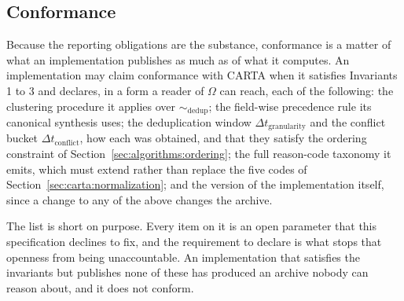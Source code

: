 \subsection{Conformance}
\label{sec:carta:conformance}

Because the reporting obligations are the substance, conformance is a matter of
what an implementation publishes as much as of what it computes. An
implementation may claim conformance with CARTA when it satisfies Invariants 1 to
3 and declares, in a form a reader of $\Omega$ can reach, each of the following:
the clustering procedure it applies over $\sim_{\text{dedup}}$; the field-wise
precedence rule its canonical synthesis uses; the deduplication window
$\Delta t_{\text{granularity}}$ and the conflict bucket
$\Delta t_{\text{conflict}}$, how each was obtained, and that they satisfy the
ordering constraint of Section~\ref{sec:algorithms:ordering}; the full reason-code
taxonomy it emits, which must extend rather than replace the five codes of
Section~\ref{sec:carta:normalization}; and the version of the implementation
itself, since a change to any of the above changes the archive.

The list is short on purpose. Every item on it is an open parameter that this
specification declines to fix, and the requirement to declare is what stops that
openness from being unaccountable. An implementation that satisfies the
invariants but publishes none of these has produced an archive nobody can reason
about, and it does not conform.
